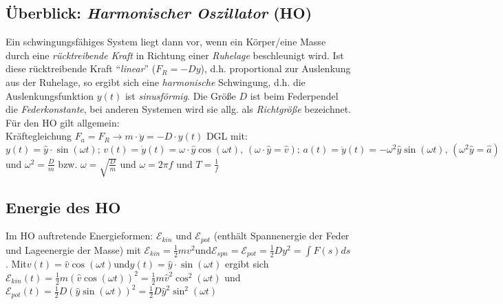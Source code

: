 \documentclass[a4paper]{scrartcl}
\begin{document}
\subsection{Überblick: \emph{Harmonischer Oszillator} (HO)}
Ein schwingungsfähiges System liegt dann vor, wenn ein Körper/eine Masse durch
eine \emph{rücktreibende Kraft} in Richtung einer \emph{Ruhelage} beschleunigt
wird. Ist diese rücktreibende Kraft "`\emph{linear}"' (\(F_R=-Dy\)), d.h.
proportional zur Auslenkung aus der Ruhelage, so ergibt sich eine
\emph{harmonische} Schwingung, d.h. die Auslenkungsfunktion \(y(t)\) ist
\emph{sinusförmig}. Die Größe \(D\) ist beim Federpendel die
\emph{Federkonstante}, bei anderen Systemen wird sie allg. als
\emph{Richtgröße} bezeichnet. Für den HO gilt allgemein:\\
Kräftegleichung \(F_a=F_R \rightarrow m \cdot \ddot{y}=-D\cdot y(t)\) DGL mit:
\(y(t) = \hat{y} \cdot \sin(\omega t);\, v(t) = \dot{y}(t) = \omega \cdot
\hat{y} \cos(\omega t),\, (\omega \cdot \hat{y}=\hat{v});\, a(t)=\ddot{y}(t) =
- \omega^2 \hat{y} \sin(\omega t),\, (\omega^2 \hat{y}=\hat{a})\) und
\(\omega^2=\frac{D}{m}\) bzw. \(\omega=\sqrt{\frac{D}{m}}\) und \(\omega = 2
\pi f\) und \(T = \frac{1}{f}\)

\subsection{Energie des HO}
Im HO auftretende Energieformen: \(\mathcal{E}_{kin}\) und \(\mathcal{E}_{pot}\)
(enthält Spannenergie der Feder und Lageenergie der Masse) mit
\(\mathcal{E}_{kin} = \frac{1}{2}mv^2\)und\(\mathcal{E}_{spn} =
\mathcal{E}_{pot} = \frac{1}{2}Dy^2 = \int F(s) ds\). Mit\(v(t) = \hat{v}
\cos(\omega t)\)und\(y(t) = \hat{y} \cdot \sin(\omega t)\) ergibt sich
\(\mathcal{E}_{kin}(t) = \frac{1}{2} m (\hat{v} \cos(\omega t))^2 = \frac{1}{2}
m \hat{v}^2 \cos^2(\omega t)\) und \(\mathcal{E}_{pot}(t) = \frac{1}{2} D
(\hat{y} \sin(\omega t))^2 = \frac{1}{2} D \hat{y}^2 \sin^2(\omega t)\)
\end{document}
